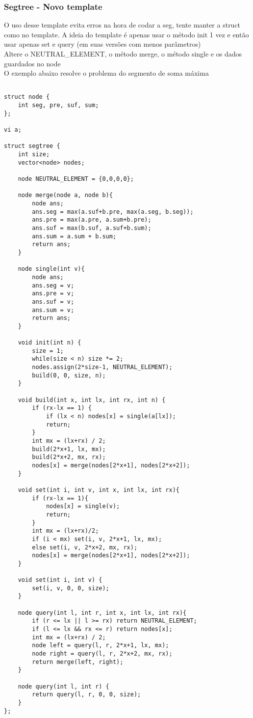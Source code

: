 \subsubsection{Segtree - Novo template}

O uso desse template evita erros na hora de codar a seg, tente manter a struct como no template. 
A ideia do template é apenas usar o método init 1 vez e então usar apenas set e query (em suas versões com menos parâmetros)\\
Altere o NEUTRAL\_ELEMENT, o método merge, o método single e os dados guardados no node\\
O exemplo abaixo resolve o problema do segmento de soma máxima

\begin{verbatim}
    
struct node {
    int seg, pre, suf, sum;
};

vi a;

struct segtree {
    int size;
    vector<node> nodes;

    node NEUTRAL_ELEMENT = {0,0,0,0};

    node merge(node a, node b){
        node ans;
        ans.seg = max(a.suf+b.pre, max(a.seg, b.seg));
        ans.pre = max(a.pre, a.sum+b.pre);
        ans.suf = max(b.suf, a.suf+b.sum);
        ans.sum = a.sum + b.sum;
        return ans;
    }

    node single(int v){
        node ans;
        ans.seg = v;
        ans.pre = v;
        ans.suf = v;
        ans.sum = v;
        return ans;
    }

    void init(int n) {
        size = 1;
        while(size < n) size *= 2;
        nodes.assign(2*size-1, NEUTRAL_ELEMENT);
        build(0, 0, size, n);
    }

    void build(int x, int lx, int rx, int n) {
        if (rx-lx == 1) {
            if (lx < n) nodes[x] = single(a[lx]);
            return;
        }
        int mx = (lx+rx) / 2;
        build(2*x+1, lx, mx);
        build(2*x+2, mx, rx);
        nodes[x] = merge(nodes[2*x+1], nodes[2*x+2]);
    }

    void set(int i, int v, int x, int lx, int rx){
        if (rx-lx == 1){
            nodes[x] = single(v);
            return;
        }
        int mx = (lx+rx)/2;
        if (i < mx) set(i, v, 2*x+1, lx, mx);
        else set(i, v, 2*x+2, mx, rx);
        nodes[x] = merge(nodes[2*x+1], nodes[2*x+2]);
    }

    void set(int i, int v) {
        set(i, v, 0, 0, size);
    }

    node query(int l, int r, int x, int lx, int rx){
        if (r <= lx || l >= rx) return NEUTRAL_ELEMENT;
        if (l <= lx && rx <= r) return nodes[x];
        int mx = (lx+rx) / 2;
        node left = query(l, r, 2*x+1, lx, mx);
        node right = query(l, r, 2*x+2, mx, rx);
        return merge(left, right);
    }

    node query(int l, int r) {
        return query(l, r, 0, 0, size);
    }
};
\end{verbatim}

